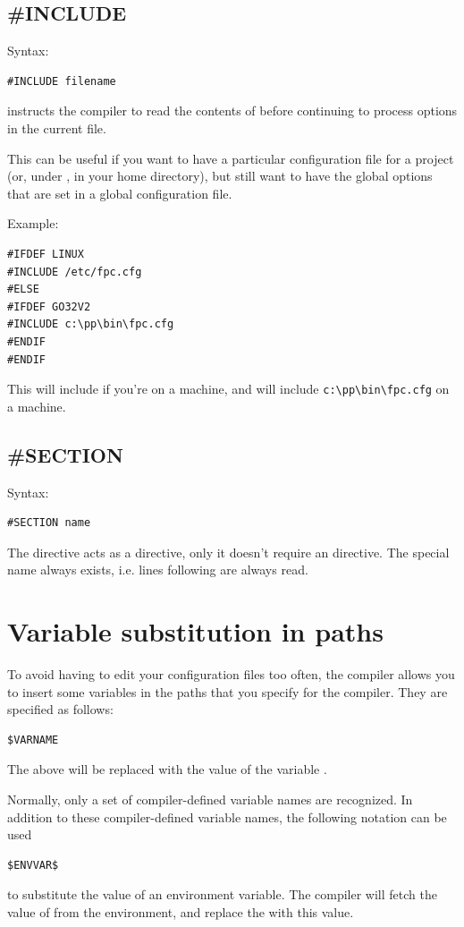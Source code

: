\subsection{\#INCLUDE}
Syntax:
\begin{verbatim}
#INCLUDE filename
\end{verbatim}
 instructs the compiler to read the contents of
 before continuing to process options in the current file.

This can be useful if you want to have a particular configuration file
for a project (or, under \linux, in your home directory), but still want to
have the global options that are set in a global configuration file.

Example:
\begin{verbatim}
#IFDEF LINUX
#INCLUDE /etc/fpc.cfg
#ELSE
#IFDEF GO32V2
#INCLUDE c:\pp\bin\fpc.cfg
#ENDIF
#ENDIF
\end{verbatim}
This will include  if you're on a \linux machine,
and will include \verb+c:\pp\bin\fpc.cfg+
on a \dos machine.

\subsection{\#SECTION}
Syntax:
\begin{verbatim}
#SECTION name
\end{verbatim}
The  directive acts as a  directive, only
it doesn't require an  directive. The special name 
always exists, i.e. lines following  are always read.

\section{Variable substitution in paths}
\label{se:VariableSubstInPath}
To avoid having to edit your configuration files too often, the compiler allows
you to insert some variables in the paths that you specify for the compiler.
They are specified as follows:
\begin{verbatim}
$VARNAME
\end{verbatim}
The above will be replaced with the value of the variable .

Normally, only a set of compiler-defined variable names are recognized.
In addition to these compiler-defined variable names, the following
notation can be used
\begin{verbatim}
$ENVVAR$
\end{verbatim}
to substitute the value of an environment variable. The compiler will fetch
the value of  from the environment, and replace the
 with this value.

